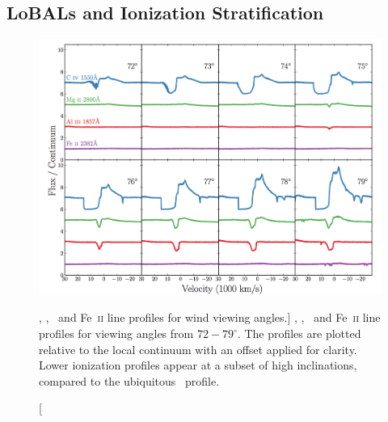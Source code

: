\subsection{LoBALs and Ionization Stratification}
\label{sec:lobal}
\begin{figure}
\centering
\includegraphics[width=1.0\textwidth]{figures/06-agnpaper/fig7.png}
\caption
[\civ , \mg , \al\ and Fe~\textsc{ii} line profiles for wind viewing angles.]
{
\civ , \mg , \al\ and Fe~\textsc{ii} line profiles for viewing angles
from $72-79^\circ$. The profiles are plotted relative to the local
continuum with an offset applied for clarity. Lower ionization
profiles appear at a subset of high inclinations, compared
to the ubiquitous \civ\ profile.
}
\label{fig:lobal}
\end{figure}


